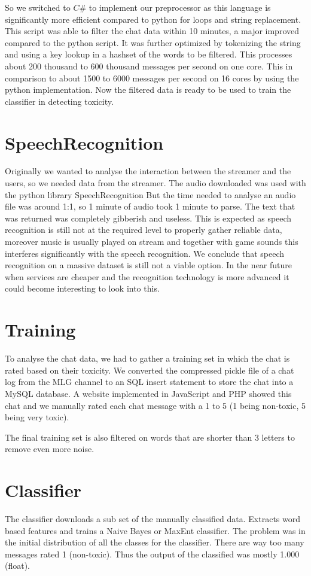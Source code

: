 \documentclass[final]{report}
\begin{document}
So we switched to $C\#$ to implement our preprocessor as this language is significantly more efficient compared to python for loops and string replacement.
This script was able to filter the chat data within 10 minutes, a major improved compared to the python script.
It was further optimized by tokenizing the string and using a key lookup in a hashset of the words to be filtered.
This processes about 200 thousand to 600 thousand messages per second on one core.
This in comparison to about 1500 to 6000 messages per second on 16 cores by using the python implementation.
Now the filtered data is ready to be used to train the classifier in detecting toxicity.

\section{SpeechRecognition}
Originally we wanted to analyse the interaction between the streamer and the users, so we needed data from the streamer.
The audio downloaded was used with the python library SpeechRecognition %
But the time needed to analyse an audio file was around 1:1, so 1 minute of audio took 1 minute to parse. The text that was returned was completely gibberish and useless.
This is expected as speech recognition is still not at the required level to properly gather reliable data, moreover music is usually played on stream and together with game sounds this interferes significantly with the speech recognition.
We conclude that speech recognition on a massive dataset is still not a viable option. 
In the near future when services are cheaper and the recognition technology is more advanced it could become interesting to look into this.

\section{Training}
To analyse the chat data, we had to gather a training set in which the chat is rated based on their toxicity.
We converted the compressed pickle file of a chat log from the MLG channel to an SQL insert statement to store the chat into a MySQL database.
A website implemented in JavaScript and PHP showed this chat and we manually rated each chat message with a 1 to 5 (1 being non-toxic, 5 being very toxic).

The final training set is also filtered on words that are shorter than 3 letters to remove even more noise.

\section{Classifier}
The classifier downloads a sub set of the manually classified data.
Extracts word based features and trains a Naive Bayes or MaxEnt classifier.
The problem was in the initial distribution of all the classes for the classifier.
There are way too many messages rated 1 (non-toxic).
Thus the output of the classified was mostly 1.000 (float).
\end{document}
